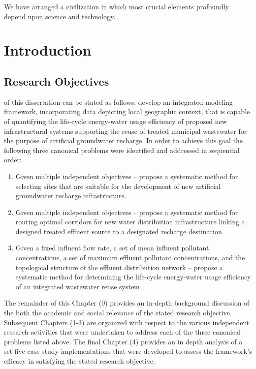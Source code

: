 \begin{savequote}[75mm]
We have arranged a civilization in which most crucial elements profoundly depend upon science and technology.
\end{savequote}

\chapter{Introduction}
\label{Introduction}

\newpage

\section{Research Objectives}

 of this dissertation can be stated as follows: develop an integrated modeling framework, incorporating data depicting local geographic context, that is capable of quantifying the life-cycle energy-water usage efficiency of proposed new infrastructural systems supporting the reuse of treated municipal wastewater for the purpose of artificial groundwater recharge. In order to achieve this goal the following three canonical problems were identified and addressed in sequential order:

    \begin{enumerate}
         
        \item Given multiple independent objectives -- propose a systematic method for selecting sites that are suitable for the development of new artificial groundwater recharge infrastructure.   
        \item Given multiple independent objectives -- propose a systematic method for routing optimal corridors for new water distribution infrastructure linking a designed treated effluent source to a designated recharge destination.
        \item Given a fixed influent flow rate, a set of mean influent pollutant concentrations, a set of maximum effluent pollutant concentrations, and the topological structure of the effluent distribution network -- propose a systematic method for determining the life-cycle energy-water usage efficiency of an integrated wastewater reuse system 
    
    \end{enumerate}
    
The remainder of this Chapter (0) provides an in-depth background discussion of the both the academic and social relevance of the stated research objective. Subsequent Chapters (1-3) are organized with respect to the various independent research activities that were undertaken to address each of the three canonical problems listed above. The final Chapter (4) provides an in depth analysis of a set five case study implementations that were developed to assess the framework's efficacy in satisfying the stated research objective. 

